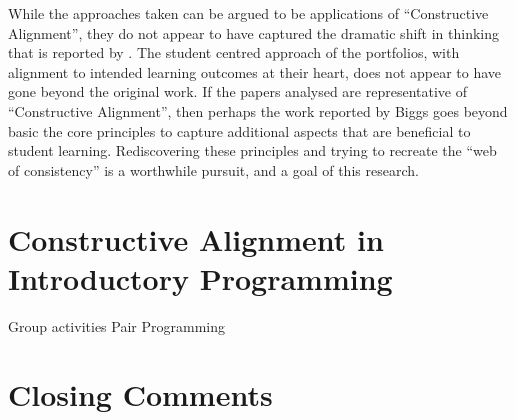 While the approaches taken can be argued to be applications of ``Constructive Alignment'', they do not appear to have captured the dramatic shift in thinking that is reported by \citet{Biggs:1996c}. The student centred approach of the portfolios, with alignment to intended learning outcomes at their heart, does not appear to have gone beyond the original work. If the papers analysed are representative of ``Constructive Alignment'', then perhaps the work reported by Biggs goes beyond basic the core principles to capture additional aspects that are beneficial to student learning. Rediscovering these principles and trying to recreate the ``web of consistency'' is a worthwhile pursuit, and a goal of this research.








\clearpage
\section{Constructive Alignment in Introductory Programming} %
\label{sec:constructive_alignment_in_introductory_programming}

Group activities Pair Programming


\section{Closing Comments} %
\label{sec:closing_comments}


